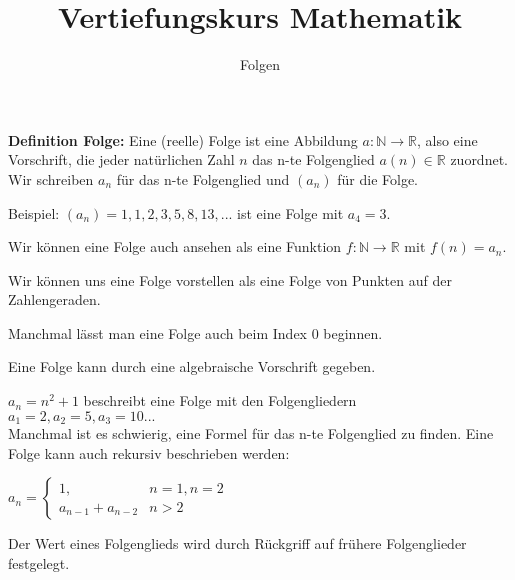 \usepackage[ngerman]{babel}
\usepackage[utf8]{inputenc}
\usepackage{amsmath}
\usepackage{amssymb}
\usepackage{listings} 
\usepackage{stmaryrd}
\lstset{language=Python, tabsize=4, showstringspaces=false,basicstyle=\footnotesize,mathescape=true} 
\usepackage{mathtools}
\usepackage{ulem}
\usepackage{tikz}

\parskip 10pt




\title{Vertiefungskurs Mathematik}   
\author{Folgen} 
\date{}
\frame{\titlepage} 

\begin{frame}[fragile]


\textbf{Definition Folge:} Eine (reelle) Folge ist eine Abbildung $a: \mathbb{N} \rightarrow \mathbb{R}$, also
eine Vorschrift, die jeder natürlichen Zahl $n$ das n-te Folgenglied $a(n) \in \mathbb{R}$ zuordnet. \pause
Wir schreiben $a_n$ für das n-te Folgenglied und $(a_n)$ für die Folge. \\ \pause
\bigskip

Beispiel: $(a_n) = 1, 1, 2, 3, 5, 8, 13, ... $ ist eine Folge mit $a_4 = 3$. \pause

Wir können eine Folge auch ansehen als eine Funktion $f: \mathbb{N} \rightarrow \mathbb{R}$ mit $f(n) = a_n$. \pause

Wir können uns eine Folge vorstellen als eine Folge von Punkten auf der Zahlengeraden. \pause

Manchmal lässt man eine Folge auch beim Index 0 beginnen.
\end{frame}


\begin{frame}[fragile]
Eine Folge kann durch eine algebraische Vorschrift gegeben. \\ \bigskip \pause

 $a_n = n^2 +1$ \quad beschreibt eine Folge mit den Folgengliedern  \pause \\ $a_1 = 2, a_2 = 5, a_3 = 10 ...$ \\
\bigskip  \pause
Manchmal ist es schwierig, eine Formel für das n-te Folgenglied zu finden. Eine Folge kann auch rekursiv beschrieben werden: \pause \bigskip 

$a_n=\begin{cases}
 1,  & n=1, n=2 \\
 a_{n-1}+a_{n-2} & n > 2 
\end{cases} $
 
Der Wert eines Folgenglieds wird durch Rückgriff auf frühere Folgenglieder festgelegt. 
\end{frame}
 

